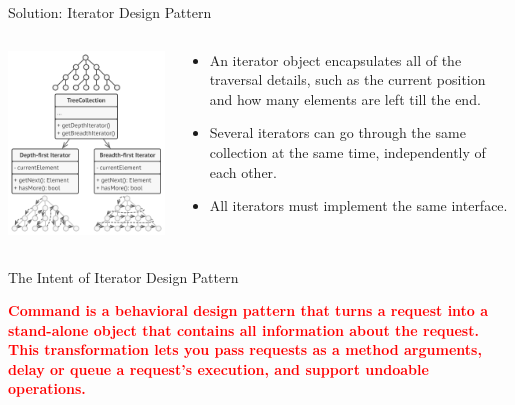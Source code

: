 \documentclass[13pt]{beamer}
\begin{document}
\begin{frame}{Solution: Iterator Design Pattern}
	\begin{columns}[T]
		\begin{column}{.5\textwidth}
			\includegraphics[scale=0.35]{./images/solution.png}
		\end{column}
	
		\begin{column}{.5\textwidth}
			\begin{itemize}
				\item An iterator object encapsulates all of the traversal details, such as the current position and how many elements are left till the end.
				\item Several iterators can go through the same collection at the same time, independently of each other.
				\item All iterators must implement the same interface. 
			\end{itemize}
		\end{column}
	\end{columns}
\end{frame}

\begin{frame}{The Intent of Iterator Design Pattern}
	\begin{center}
	\textcolor{red}{\textbf{Command is a behavioral design pattern that turns a request into a stand-alone object that contains all information about the request. This transformation lets you pass requests as a method arguments, delay or queue a request’s execution, and support undoable operations.}}\\
	\end{center}
\end{frame}
\end{document}
